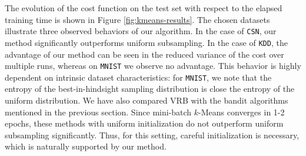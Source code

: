The evolution of the cost function on the test set with respect to the elapsed training time is shown in Figure \ref{fig:kmeans-results}. The chosen datasets illustrate three observed behaviors of our algorithm. In the case of \texttt{CSN}, our method significantly outperforms uniform subsampling. In the case of \texttt{KDD}, the advantage of our method can be seen in the reduced variance of the cost over multiple runs, whereas on \texttt{MNIST} we observe no advantage.
This behavior is highly dependent on intrinsic dataset characteristics: for \texttt{MNIST}, we note that the entropy of the best-in-hindsight sampling distribution is close the entropy of the uniform distribution. We have also compared VRB with the bandit algorithms mentioned in the previous section. Since mini-batch $k$-Means converges in 1-2 epochs, these methods with  uniform initialization do not outperform uniform subsampling significantly. Thus, for this setting, careful initialization is necessary, which is naturally supported by our method.
